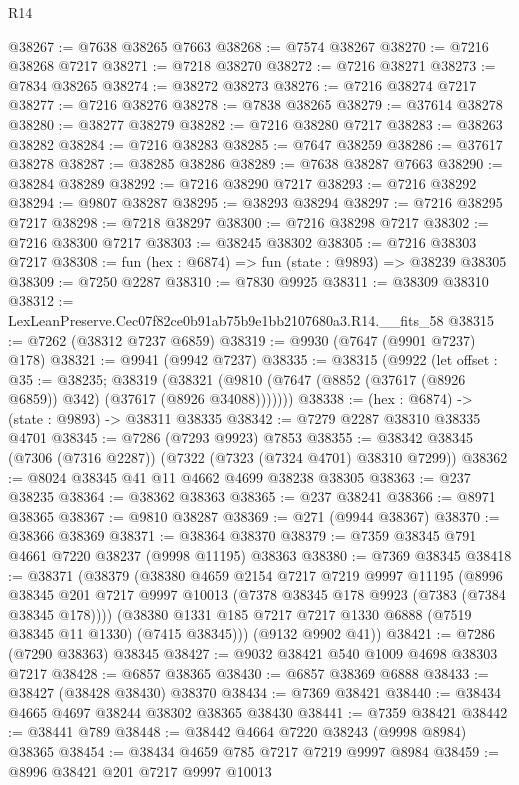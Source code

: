 \begin{lexlean}{R14}
\begin{coremodule}
@38267 := @7638 @38265 @7663
@38268 := @7574 @38267
@38270 := @7216 @38268 @7217
@38271 := @7218 @38270
@38272 := @7216 @38271
@38273 := @7834 @38265
@38274 := @38272 @38273
@38276 := @7216 @38274 @7217
@38277 := @7216 @38276
@38278 := @7838 @38265
@38279 := @37614 @38278
@38280 := @38277 @38279
@38282 := @7216 @38280 @7217
@38283 := @38263 @38282
@38284 := @7216 @38283
@38285 := @7647 @38259
@38286 := @37617 @38278
@38287 := @38285 @38286
@38289 := @7638 @38287 @7663
@38290 := @38284 @38289
@38292 := @7216 @38290 @7217
@38293 := @7216 @38292
@38294 := @9807 @38287
@38295 := @38293 @38294
@38297 := @7216 @38295 @7217
@38298 := @7218 @38297
@38300 := @7216 @38298 @7217
@38302 := @7216 @38300 @7217
@38303 := @38245 @38302
@38305 := @7216 @38303 @7217
@38308 := fun (hex : @6874) => fun (state : @9893) => @38239 @38305
@38309 := @7250 @2287
@38310 := @7830 @9925
@38311 := @38309 @38310
@38312 := LexLeanPreserve.Cec07f82ce0b91ab75b9e1bb2107680a3.R14.__fits_58
@38315 := @7262 (@38312 @7237 @6859)
@38319 := @9930 (@7647 (@9901 @7237) @178)
@38321 := @9941 (@9942 @7237)
@38335 := @38315
    (@9922
      (let offset : @35 := @38235;
      @38319 (@38321 (@9810 (@7647 (@8852 (@37617 (@8926 @6859)) @342) (@37617 (@8926 @34088)))))))
@38338 := (hex : @6874) -> (state : @9893) -> @38311 @38335
@38342 := @7279 @2287 @38310 @38335 @4701
@38345 := @7286 (@7293 @9923) @7853
@38355 := @38342 @38345 (@7306 (@7316 @2287)) (@7322 (@7323 (@7324 @4701) @38310 @7299))
@38362 := @8024 @38345 @41 @11 @4662 @4699 @38238 @38305
@38363 := @237 @38235
@38364 := @38362 @38363
@38365 := @237 @38241
@38366 := @8971 @38365
@38367 := @9810 @38287
@38369 := @271 (@9944 @38367)
@38370 := @38366 @38369
@38371 := @38364 @38370
@38379 := @7359 @38345 @791 @4661 @7220 @38237 (@9998 @11195) @38363
@38380 := @7369 @38345
@38418 := @38371
    (@38379
      (@38380
        @4659
        @2154
        @7217
        @7219
        @9997
        @11195
        (@8996 @38345 @201 @7217 @9997 @10013 (@7378 @38345 @178 @9923 (@7383 (@7384 @38345 @178))))
        (@38380 @1331 @185 @7217 @7217 @1330 @6888 (@7519 @38345 @11 @1330) (@7415 @38345)))
      (@9132 @9902 @41))
@38421 := @7286 (@7290 @38363) @38345
@38427 := @9032 @38421 @540 @1009 @4698 @38303 @7217
@38428 := @6857 @38365
@38430 := @6857 @38369 @6888
@38433 := @38427 (@38428 @38430) @38370
@38434 := @7369 @38421
@38440 := @38434 @4665 @4697 @38244 @38302 @38365 @38430
@38441 := @7359 @38421
@38442 := @38441 @789
@38448 := @38442 @4664 @7220 @38243 (@9998 @8984) @38365
@38454 := @38434 @4659 @785 @7217 @7219 @9997 @8984
@38459 := @8996 @38421 @201 @7217 @9997 @10013

\end{coremodule}
\end{lexlean}
